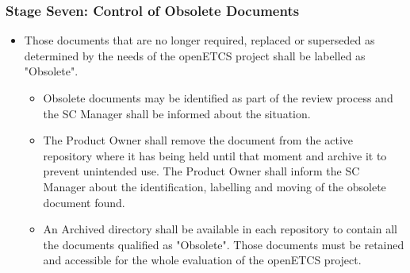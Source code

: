 \documentclass{template/openetcs_article}
\begin{document}
\subsubsection{Stage Seven: Control of Obsolete Documents}
\begin{itemize}
\item Those documents that are no longer required, replaced or superseded as determined by the needs of the openETCS project shall be labelled as "Obsolete". 
\begin{itemize}
\item Obsolete documents may be identified as part of the review process and the SC Manager shall be informed about the situation.
\item The Product Owner shall remove the document from the active repository where it has being held until that moment and archive it to prevent unintended use. The Product Owner shall inform the SC Manager about the identification, labelling and moving of the obsolete document found.  
\item An Archived directory shall be available in each repository to contain all the documents qualified as "Obsolete". Those documents must be retained and accessible for the whole evaluation of the openETCS project.
\end{itemize}
\end{itemize}
\end{document}
